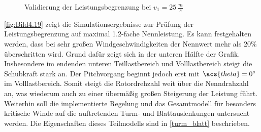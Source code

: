 \begin{figure}[H]
   \centering
   \caption[Constraint Leistungsbegrenzung]{Validierung der Leistungsbegrenzung bei $v_1 = \SI{25}{\frac{m}{s}}$}
   \label{fig:Bild4.19}
\end{figure}

\autoref{fig:Bild4.19} zeigt die Simulationsergebnisse zur Prüfung der Leistungsbegrenzung auf maximal 1.2-fache Nennleistung. Es kann festgehalten werden, dass bei sehr großen Windgeschwindigkeiten der Nennwert mehr als $20\%$ überschritten wird. Grund dafür zeigt sich in der unteren Hälfte der Grafik. Insbesondere im endenden unteren Teillastbereich und Volllastbereich steigt die Schubkraft stark an. Der Pitchvorgang beginnt jedoch erst mit $\acs{theta} = 0^\circ$ im Volllastbereich. Somit steigt die Rotordrehzahl weit über die Nenndrahzahl an, was wiederum auch zu einer übermäßig großen Steigerung der Leistung führt.\\

Weiterhin soll die implementierte Regelung und das Gesamtmodell für besonders kritische Winde auf die auftretenden Turm- und Blattauslenkungen untersucht werden. Die Eigenschaften dieses Teilmodells sind in \autoref{turm_blatt} beschrieben.\\

